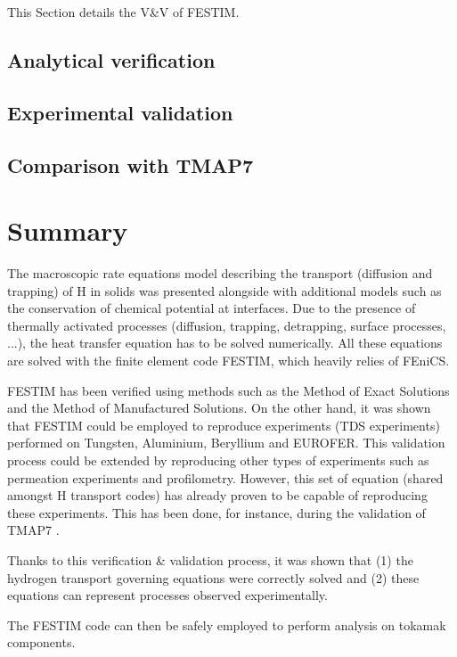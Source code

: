 This Section details the V\&V of FESTIM.

\subsection{Analytical verification}



\subsection{Experimental validation}



\subsection{Comparison with TMAP7}



\section{Summary}

The macroscopic rate equations model describing the transport (diffusion and trapping) of H in solids was presented alongside with additional models such as the conservation of chemical potential at interfaces.
Due to the presence of thermally activated processes (diffusion, trapping, detrapping, surface processes, ...), the heat transfer equation has to be solved numerically.
All these equations are solved with the finite element code FESTIM, which heavily relies of FEniCS.

FESTIM has been verified using methods such as the Method of Exact Solutions and the Method of Manufactured Solutions.
On the other hand, it was shown that FESTIM could be employed to reproduce experiments (TDS experiments) performed on Tungsten, Aluminium, Beryllium and EUROFER.
This validation process could be extended by reproducing other types of experiments such as permeation experiments and profilometry.
However, this set of equation (shared amongst H transport codes) has already proven to be capable of reproducing these experiments.
This has been done, for instance, during the validation of TMAP7 .

Thanks to this verification \& validation process, it was shown that (1) the hydrogen transport governing equations were correctly solved and (2) these equations can represent processes observed experimentally.

The FESTIM code can then be safely employed to perform analysis on tokamak components.
